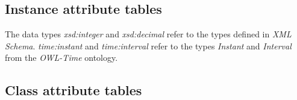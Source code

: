 
\subsection{Instance attribute tables}
\label{subsec:instance_attribute_tables}



The data types \emph{xsd:integer} and \emph{xsd:decimal} refer to the types defined in \emph{XML Schema}\cite{xml-schema-datatypes}. \emph{time:instant} and \emph{time:interval} refer to the types \emph{Instant} and \emph{Interval} from the \emph{OWL-Time}  ontology\cite{owl-time}.


\subsection{Class attribute tables}


